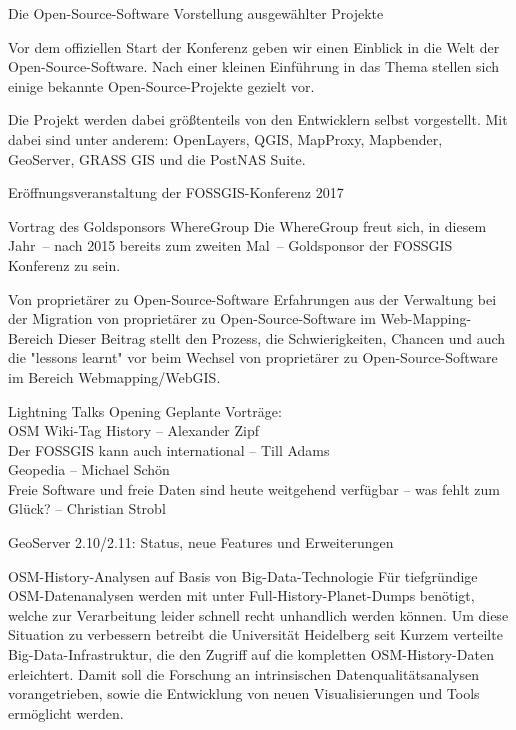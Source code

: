 \newpage
\renewcommand{\konferenztag}{\mittwoch}
%
{Die Open-Source-Software}%
{Vorstellung ausgewählter Projekte}%
{Vor dem offiziellen Start der Konferenz geben wir einen Einblick in die Welt der Open-Source-Software. Nach einer kleinen Einführung in das Thema stellen sich einige bekannte Open-Source-Projekte gezielt vor.

Die Projekt werden dabei größtenteils von den Entwicklern selbst vorgestellt. Mit dabei sind unter anderem:
OpenLayers, QGIS, MapProxy, Mapbender, GeoServer, GRASS GIS und die PostNAS Suite.}

%
%
{Eröffnungsveranstaltung der FOSSGIS-Konferenz 2017}%
{}%
{}

%
%
{Vortrag des Goldsponsors WhereGroup}%
{}%
{Die WhereGroup freut sich, in diesem Jahr~-- nach 2015 bereits zum zweiten Mal~--
Goldsponsor der FOSSGIS Konferenz zu sein.}

%
{Von proprietärer zu Open-Source-Software}%
{Erfahrungen aus der Verwaltung bei der Migration von proprietärer zu Open-Source-Software im
Web-Mapping-Bereich}%
{Dieser Beitrag stellt den Prozess, die Schwierigkeiten, Chancen und auch die "lessons learnt" vor
beim Wechsel von proprietärer zu Open-Source-Software im Bereich Webmapping/WebGIS.}

%
\abstractZehn{}%
{Lightning Talks Opening}%
{}%
{Geplante Vorträge:\\
OSM Wiki-Tag History -- Alexander Zipf\\
Der FOSSGIS kann auch international -- Till Adams\\
Geopedia -- Michael Schön\\
Freie Software und freie Daten sind heute weitgehend verfügbar -- was fehlt zum Glück? -- Christian
Strobl}

%
{GeoServer 2.10/2.11: Status, neue Features und Erweiterungen}%
{}%
{%
}

%
{OSM-History-Analysen auf Basis von Big-Data-Technologie}%
{}%
{Für tiefgründige OSM-Datenanalysen werden mit unter Full-History-Planet-Dumps benötigt, welche zur
Verarbeitung leider schnell recht unhandlich werden können. Um diese Situation zu verbessern
betreibt die Universität Heidelberg seit Kurzem verteilte Big-Data-Infrastruktur, die den Zugriff
auf die kompletten OSM-History-Daten erleichtert. Damit soll die Forschung an intrinsischen
Datenqualitätsanalysen vorangetrieben, sowie die Entwicklung von neuen Visualisierungen und Tools
ermöglicht werden.}%

